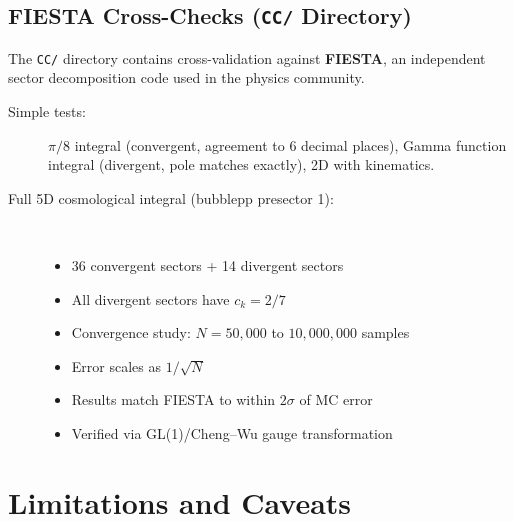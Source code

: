 \documentclass[11pt,a4paper]{article}
\begin{document}
\subsection{FIESTA Cross-Checks (\texttt{CC/} Directory)}

The \texttt{CC/} directory contains cross-validation against \textbf{FIESTA}, an independent sector decomposition code used in the physics community.

\begin{description}
  \item[Simple tests:] $\pi/8$ integral (convergent, agreement to 6 decimal places), Gamma function integral (divergent, pole matches exactly), 2D with kinematics.

  \item[Full 5D cosmological integral (bubblepp presector 1):]~
    \begin{itemize}
      \item 36 convergent sectors + 14 divergent sectors
      \item All divergent sectors have $c_k = 2/7$
      \item Convergence study: $N = 50{,}000$ to $10{,}000{,}000$ samples
      \item Error scales as $1/\sqrt{N}$
      \item Results match FIESTA to within $2\sigma$ of MC error
      \item Verified via GL(1)/Cheng--Wu gauge transformation
    \end{itemize}
\end{description}

\section{Limitations and Caveats}
\end{document}
